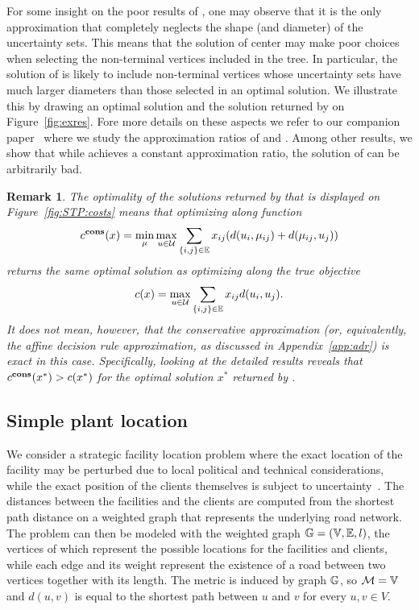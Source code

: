 \documentclass[12pt]{article}
\newtheorem{remark}{Remark}
\newcommand{\blue}[1]{{\color{black}#1}}
\begin{document}
\blue{For some insight on the poor results of \hcenter{}, one may observe that it is the only approximation that completely neglects the shape (and diameter) of the uncertainty sets. This means that the solution of center may make poor choices when selecting the non-terminal vertices included in the tree. In particular, the solution of \hcenter{} is likely to include non-terminal vertices whose uncertainty sets have much larger diameters than those selected in an optimal solution. We illustrate this by drawing an optimal solution and  the solution returned by \hcenter{} on Figure~\ref{fig:exres}. Fore more details on these aspects we refer to our companion paper~\cite{abs-2206-08187} where we study the approximation ratios of \worst{} and \hcenter{}. Among other results, we show that while \worst{} achieves a constant approximation ratio, the solution of \hcenter{} can be arbitrarily bad.}
\begin{remark}
 The optimality of the solutions returned by \cons{} that is displayed on Figure~\ref{fig:STP:costs} means that optimizing along function $$c^{\textbf{cons}}(x)=\min\limits_{\mu}\max\limits_{u\in\mathcal{U}}\sum\limits_{\{i,j\}\in \mathbb{E}} x_{ij}(d(u_i,\mu_{ij})+d(\mu_{ij},u_j))$$ returns the same optimal solution as optimizing along the true objective $$c(x)=\max\limits_{u\in\mathcal{U}}\sum\limits_{\{i,j\}\in \mathbb{E}} x_{ij}d(u_i,u_j).$$
 It does not mean, however, that the conservative approximation (or, equivalently, the affine decision rule approximation, as discussed in Appendix~\ref{app:adr}) is exact in this case. Specifically, looking at the detailed results reveals that $c^{\textbf{cons}}(x^*)>c(x^*)$ for the optimal solution $x^*$ returned by \cons.
\end{remark}


\subsection{Simple plant location}

We consider a strategic facility location problem where the exact location of the facility may be perturbed due to local political and technical considerations, while the exact position of the clients themselves is subject to uncertainty~\citep{correia2015facility}. The distances between the facilities and the clients are computed from the shortest path distance on a weighted graph that represents the underlying road network. The problem can then be modeled with the weighted graph $\mathbb{G}=(\mathbb{V},\mathbb{E},l)$, the vertices of which represent the possible locations for the facilities and clients, while each edge and its weight represent the existence of a road between two vertices together with its length. The metric is induced by graph $\mathbb{G}$, so $\mathcal{M}=\mathbb{V}$ and $d(u,v)$ is equal to the shortest path between $u$ and $v$ for every $u,v\in V$. 
\end{document}
